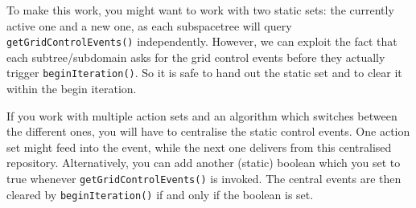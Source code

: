 To make this work, you might want to work with two static sets: the currently
active one and a new one, as each subspacetree will query
\texttt{getGridControlEvents()} independently.
However, we can exploit the fact that each subtree/subdomain asks for the grid
control events before they actually trigger \texttt{beginIteration()}. 
So it is safe to hand out the static set and to clear it within the begin
iteration.


If you work with multiple action sets and an algorithm which switches between
the different ones, you will have to centralise the static control events.
One action set might feed into the event, while the next one delivers from this
centralised repository.
Alternatively, you can add another (static) boolean which you set to true
whenever \texttt{getGridControlEvents()} is invoked.
The central events are then cleared by \texttt{beginIteration()} if and only if
the boolean is set.
